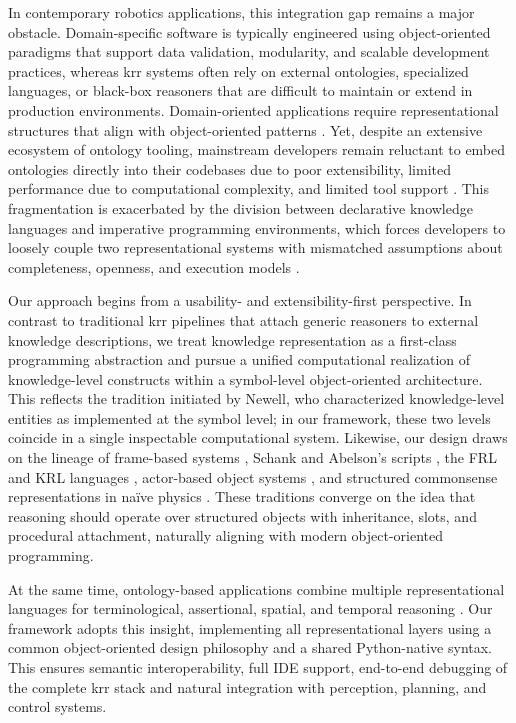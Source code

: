 \documentclass{article}
\begin{document}
In contemporary robotics applications, this integration gap remains a major obstacle. Domain-specific software is typically engineered using object-oriented paradigms that support data validation, modularity, and scalable development practices, whereas \ac{krr} systems often rely on external ontologies, specialized languages, or black-box reasoners that are difficult to maintain or extend in production environments. Domain-oriented applications require representational structures that align with object-oriented patterns \cite{ledvinka2020comparison}. Yet, despite an extensive ecosystem of ontology tooling, mainstream developers remain reluctant to embed ontologies directly into their codebases due to poor extensibility, limited performance due to computational complexity, and limited tool support \cite{baset2018object,abicht2023owl}. This fragmentation is exacerbated by the division between declarative knowledge languages and imperative programming environments, which forces developers to loosely couple two representational systems with mismatched assumptions about completeness, openness, and execution models \cite{alcaraz2012towards}.

Our approach begins from a usability- and extensibility-first perspective. In contrast to traditional \ac{krr} pipelines that attach generic reasoners to external knowledge descriptions, we treat knowledge representation as a first-class programming abstraction and pursue a unified computational realization of knowledge-level constructs within a symbol-level object-oriented architecture. This reflects the tradition initiated by Newell, who characterized knowledge-level entities as implemented at the symbol level; in our framework, these two levels coincide in a single inspectable computational system. Likewise, our design draws on the lineage of frame-based systems \cite{minsky1974framework}, Schank and Abelson's scripts \cite{schank1977scripts}, the FRL \cite{roberts1977frl} and KRL languages \cite{bobrow1977overview}, actor-based object systems \cite{hewitt2010actor}, and structured commonsense representations in naïve physics \cite{hayes1985second}. These traditions converge on the idea that reasoning should operate over structured objects with inheritance, slots, and procedural attachment, naturally aligning with modern object-oriented programming.

At the same time, ontology-based applications combine multiple representational languages for terminological, assertional, spatial, and temporal reasoning \cite{haarslev2012racerpro}. Our framework adopts this insight, implementing all representational layers using a common object-oriented design philosophy and a shared Python-native syntax. This ensures semantic interoperability, full IDE support, end-to-end debugging of the complete \ac{krr} stack and natural integration with perception, planning, and control systems.
\end{document}

